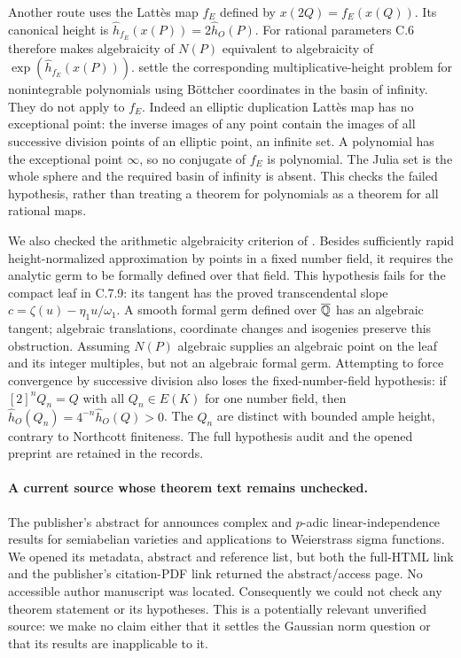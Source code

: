 Another route uses the Latt\`es map $f_E$ defined by
$x(2Q)=f_E(x(Q))$. Its canonical height is
$\widehat h_{f_E}(x(P))=2\widehat h_O(P)$. For rational
parameters C.6 therefore makes algebraicity of $N(P)$
equivalent to algebraicity of
$\exp(\widehat h_{f_E}(x(P)))$.
\citet[Theorem 1.4 and Corollary 1.6]{nguyen2023} settle the
corresponding multiplicative-height problem for nonintegrable
polynomials using B\"ottcher coordinates in the basin of
infinity. They do not apply to $f_E$. Indeed an elliptic
duplication Latt\`es map has no exceptional point: the inverse
images of any point contain the images of all successive
division points of an elliptic point, an infinite set. A
polynomial has the exceptional point $\infty$, so no conjugate
of $f_E$ is polynomial. The Julia set is the whole sphere
and the required basin of infinity is absent. This checks
the failed hypothesis, rather than treating a theorem for
polynomials as a theorem for all rational maps.

We also checked the arithmetic algebraicity criterion of
\citet[Theorems 1.3 and 2.3]{xie2024algebraicity}.
Besides sufficiently rapid height-normalized approximation by
points in a fixed number field, it requires the analytic germ
to be formally defined over that field. This hypothesis fails
for the compact leaf in C.7.9: its tangent has the proved
transcendental slope
$c=\zeta(u)-\eta_1u/\omega_1$.
A smooth formal germ defined over $\overline{\mathbb Q}$ has an
algebraic tangent; algebraic translations, coordinate changes
and isogenies preserve this obstruction. Assuming $N(P)$
algebraic supplies an algebraic point on the leaf and its
integer multiples, but not an algebraic formal germ. Attempting
to force convergence by successive division also loses the
fixed-number-field hypothesis: if $[2]^nQ_n=Q$ with all
$Q_n\in E(K)$ for one number field, then
$\widehat h_O(Q_n)=4^{-n}\widehat h_O(Q)>0$.
The $Q_n$ are distinct with bounded ample height, contrary to
Northcott finiteness. The full hypothesis audit and the opened
preprint are retained in the records.

\paragraph{A current source whose theorem text remains unchecked.}
The publisher's abstract for \citet{pham2025sigma} announces
complex and $p$-adic linear-independence results for semiabelian
varieties and applications to Weierstrass sigma functions.
We opened its metadata, abstract and reference list, but both
the full-HTML link and the publisher's citation-PDF link returned
the abstract/access page. No accessible author manuscript was
located. Consequently we could not check any theorem statement
or its hypotheses. This is a potentially relevant unverified
source: we make no claim either that it settles the Gaussian
norm question or that its results are inapplicable to it.

